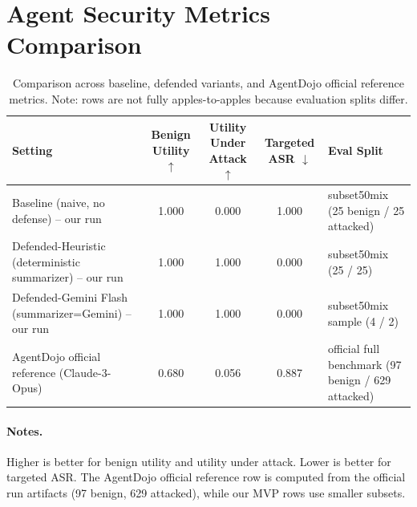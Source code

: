 \documentclass[11pt]{article}
\begin{document}
\section*{Agent Security Metrics Comparison}
\begin{table}[h!]
\centering
\small
\begin{tabular}{>{\raggedright\arraybackslash}p{6.2cm} c c c >{\raggedright\arraybackslash}p{4.7cm}}
\toprule
Setting & Benign Utility $\uparrow$ & Utility Under Attack $\uparrow$ & Targeted ASR $\downarrow$ & Eval Split \\
\midrule
Baseline (naive, no defense) – our run & 1.000 & 0.000 & 1.000 & subset50mix (25 benign / 25 attacked) \\ 
Defended-Heuristic (deterministic summarizer) – our run & 1.000 & 1.000 & 0.000 & subset50mix (25 / 25) \\ 
Defended-Gemini Flash (summarizer=Gemini) – our run & 1.000 & 1.000 & 0.000 & subset50mix sample (4 / 2) \\ 
AgentDojo official reference (Claude-3-Opus) & 0.680 & 0.056 & 0.887 & official full benchmark (97 benign / 629 attacked) \\ 
\bottomrule
\end{tabular}
\caption{Comparison across baseline, defended variants, and AgentDojo official reference metrics. Note: rows are not fully apples-to-apples because evaluation splits differ.}
\end{table}

\paragraph{Notes.}
Higher is better for benign utility and utility under attack. Lower is better for targeted ASR. The AgentDojo official reference row is computed from the official run artifacts (97 benign, 629 attacked), while our MVP rows use smaller subsets.
\end{document}
